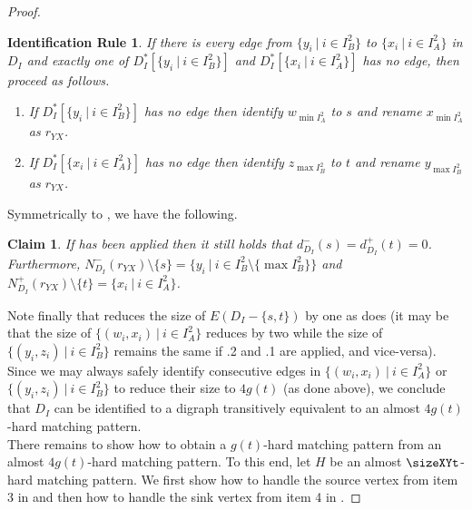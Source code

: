 \documentclass[a4paper,11pt]{article}
\theoremstyle{plain}
\newtheorem{claim}[theorem]{Claim}
\newtheorem{identification rule}{Identification Rule}
\theoremstyle{definition}
\theoremstyle{remark}
\begin{document}
\begin{proof}
\begin{identification rule}
\label{rr:YX}
If there is every edge from $\{y_i~|~i \in I_B^2\}$ to $\{x_i~|~i \in I_A^2\}$ in $D_I$ 
and exactly one of $D_I^*[\{y_i~|~i \in I_B^2\}]$ and $D_I^*[\{x_i~|~i \in I_A^2\}]$ has no edge, then proceed as follows.
\begin{enumerate}
\item If $D_I^*[\{y_i~|~i \in I_B^2\}]$ has no edge then identify $w_{\min I_A^2}$ to $s$ and
rename $x_{\min I_A^2}$ as $r_{YX}$.
\item If $D_I^*[\{x_i~|~i \in I_A^2\}]$ has no edge then identify $z_{\max I_B^2}$ to $t$ and 
rename $y_{\max I_B^2}$ as $r_{YX}$.
\end{enumerate}
\end{identification rule}

Symmetrically to , we have the following.

\begin{claim}
\label{clm:renamingYX}
If  has been applied then it still holds that $d^-_{D_I}(s) = d^+_{D_I}(t) = 0$.
Furthermore, $N^-_{D_I}(r_{YX}) \setminus \{s\} = \{y_i~|~i \in I_B^2 \setminus \{\max I_B^2\}\}$ and $N^+_{D_I}(r_{YX}) \setminus \{t\} = \{x_i~|~i \in I_A^2\}$.
\end{claim}

Note finally that  reduces the size of $E(D_I - \{s,t\})$ by one as does  (it may be that the size of $\{(w_i,x_i)~|~i \in I_A^2\}$ reduces by two while the size of $\{(y_i,z_i)~|~i \in I_B^2\}$ remains the same if .2 and .1 are applied, and vice-versa). Since we may always safely identify consecutive edges in $\{(w_i,x_i)~|~i \in I_A^2\}$ or $\{(y_i,z_i)~|~i \in I_B^2\}$ to reduce their size to $4g(t)$ (as done above), we conclude that $D_I$ can be identified to a digraph transitively equivalent to an almost $4g(t)$-hard matching pattern.\\

There remains to show how to obtain a $g(t)$-hard matching pattern from an almost $4g(t)$-hard matching pattern. To this end, let $H$ be an almost $\sizeXYt$-hard matching pattern. We first show how to handle the source vertex from item 3 in  and then how to handle the sink vertex from item 4 in .


\end{proof}
\end{document}
